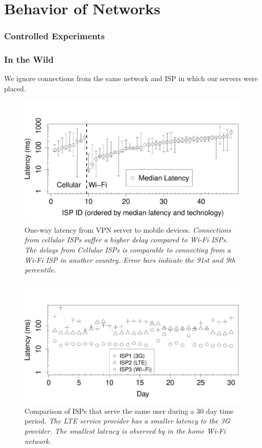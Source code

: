 \section{Behavior of Networks}

\subsubsection{Controlled Experiments}

\subsubsection{In the Wild}

We ignore connections from the same network and ISP in which our servers were placed.


\begin{figure}[t]
\includegraphics[width=\columnwidth]{plots/latency_isp_whisker.pdf}
\caption{One-way latency from VPN server to mobile devices. \emph{Connections from cellular ISPs suffer a higher delay compared to Wi-Fi ISPs. The delays from Cellular ISPs is comparable to connecting from a Wi-Fi ISP in another country. Error bars indicate the 91st and 9th percentile}.}
\label{fig:latency-across-isps}
\end{figure}


\begin{figure}[t]
\includegraphics[width=\columnwidth]{plots/compare_isp_latency.pdf}
\caption{Comparison of ISPs that serve the same user during a 30 day time period. \emph{The LTE service provider has a smaller latency to the 3G provider. The smallest latency is observed by in the home Wi-Fi network.}}
\label{fig:compare-isp-latency}
\end{figure}

